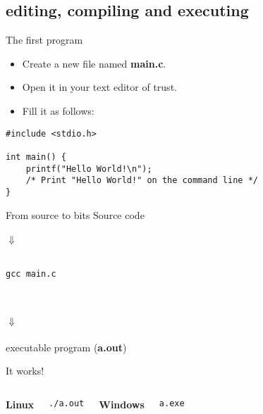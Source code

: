 \subsection{editing, compiling and executing}
\begin{frame}[fragile]{The first program}
	\begin{itemize}
		\item Create a new file named \textbf{main.c}.
		\item Open it in your text editor of trust.
		\item Fill it as follows:
	\end{itemize}
	\begin{lstlisting}
#include <stdio.h>

int main() {
	printf("Hello World!\n");
	/* Print "Hello World!" on the command line */
}
\end{lstlisting}
\end{frame}
\begin{frame}[fragile]{From source to bits}
	\centering
	Source code\\\ \\
	$\Downarrow$\\\ \\
	\begin{lstlisting}[numbers=none]
gcc main.c
\end{lstlisting}
	\ \\\ \\
	$\Downarrow$\\\ \\
	executable program (\textbf{a.out})\\
\end{frame}
\begin{frame}[fragile]{It works!}
	\begin{columns}[T]
		\textbf{Linux}\\
		\begin{lstlisting}[numbers=none]
./a.out
\end{lstlisting}
		\textbf{Windows}\\
		\begin{lstlisting}[numbers=none]
a.exe
\end{lstlisting}
	\end{columns}
\end{frame}

